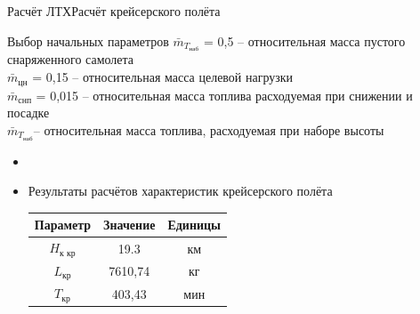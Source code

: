 \begin{frame}{Расчёт ЛТХ}{Расчёт крейсерского полёта}
    \begin{block}{Выбор начальных параметров}
        $\bar{m}_{T_\text{наб}}$ = 0,5 – относительная масса пустого снаряженного самолета \\ 
        $\bar{m}_\text{цн}$ = 0,15 – относительная масса целевой нагрузки \\ 
        $\bar{m}_\text{снп}$ = 0,015 – относительная масса топлива 
        расходуемая при снижении и посадке  \\
        $\bar{m}_{T_\text{наб}}$– относительная масса топлива, расходуемая при наборе высоты \\
    \end{block}
    \begin{itemize}
        \item <+-> []
    \item <+-> [] \begin{block}{Результаты расчётов характеристик крейсерского полёта}
        \begin{table}
            \begin{tabular}{|c|c|c|}
                \hline
                Параметр& Значение & Единицы\\ \hline
                $H_\text{к \ кр}$& 19.3 & км\\ \hline
                $L_\text{кр}$& 7610,74 &кг \\ \hline
                $T_\text{кр}$& 403,43 & мин\\ \hline
            \end{tabular}
        \end{table}
    \end{block}
    \end{itemize}
\end{frame} 

